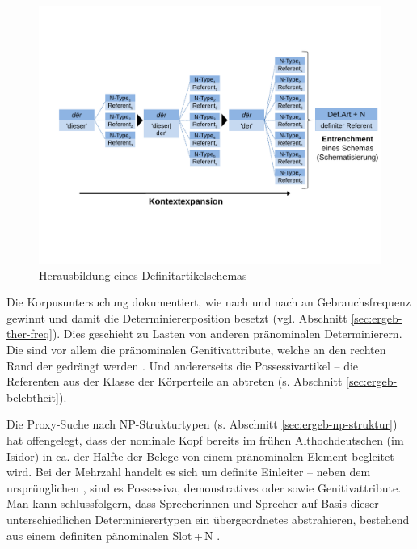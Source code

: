 \begin{figure}
\begin{center}
  \includegraphics[width=12cm]{images/expansion.pdf}
\caption {Herausbildung eines Definitartikelschemas} 
\label{abb:entrenchment-ther}
\end{center}
\end{figure} 

Die Korpusuntersuchung  dokumentiert, wie  nach und nach an Gebrauchsfrequenz gewinnt und damit die Determiniererposition besetzt (vgl. Abschnitt \ref{sec:ergeb-ther-freq}). Dies geschieht zu Lasten von anderen pränominalen Determinierern. Die  sind vor allem die pränominalen  Genitivattribute, welche an den rechten Rand der  gedrängt werden   \parencite[zur weiterführenden Diskussion s.][]{Demske2001}. Und andererseits die  Possessivartikel -- die  Referenten aus der Klasse der Körperteile an  abtreten (s. Abschnitt \ref{sec:ergeb-belebtheit}). 

Die Proxy-Suche  nach NP-Strukturtypen  (s. Abschnitt \ref{sec:ergeb-np-struktur}) hat offengelegt, dass der nominale Kopf bereits im frühen Althochdeutschen (im Isidor) in ca. der Hälfte der Belege von einem pränominalen Element begleitet wird. Bei der Mehrzahl handelt es sich um definite Einleiter -- neben dem ursprünglichen  , sind es  Possessiva, demonstratives  oder   sowie  Genitivattribute. Man kann schlussfolgern, dass Sprecherinnen und Sprecher auf Basis dieser unterschiedlichen Determinierertypen ein übergeordnetes  abstrahieren, bestehend aus einem definiten pänominalen Slot\,+\,N \parencite[ähnlich fürs Altenglische][]{Sommerer2011}. 
  
